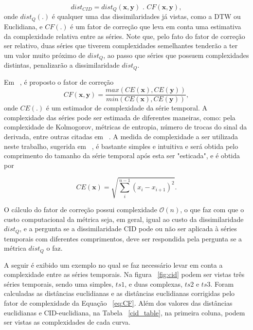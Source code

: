 \begin{equation}
dist_{CID} = dist_{Q}(\bm{x},\bm{y}) \text{ . } CF(\bm{x},\bm{y}),
\end{equation}
onde $dist_{Q}(.)$ é qualquer uma das dissimilaridades já vistas, como a DTW ou Euclidiana, e $CF(.)$ é um fator de correção que leva em conta uma estimativa da complexidade relativa entre as séries. Note que, pelo fato do fator de correção ser relativo, duas séries que tiverem complexidades semelhantes tenderão a ter um valor muito próximo de $dist_{Q}$, ao passo que séries que possuem complexidades distintas, penalizarão a dissimilaridade $dist_{Q}$.

Em ~\parencite{CID}, é proposto o fator de correção
\begin{equation} \label{eq:CF}
CF (\bm{x},\bm{y}) = \frac{max(CE(\bm{x}),CE(\bm{y}))}{min(CE(\bm{x}),CE(\bm{y}))},
\end{equation}
onde $CE(.)$ é um estimador de complexidade da série temporal.  A complexidade das séries pode ser estimada de diferentes maneiras, como: pela complexidade de Kolmogorov, métricas de entropia, número de trocas do sinal da derivada, entre outras citadas em ~\parencite{TSCLUST}. A medida de complexidade a ser utilizada neste trabalho, sugerida em ~\parencite{CID}, é bastante simples e intuitiva e será obtida pelo comprimento do tamanho da série temporal após esta ser "esticada", e é obtida por 

\begin{equation} \label{eq:CE}
CE(\bm{x}) = \sqrt{\sum_{i}^{n-1} (x_i - x_{i+1})^2}.
\end{equation}

O cálculo do fator de correção possui complexidade $\mathcal{O}(n)$, o que faz com que o custo computacional da métrica seja, em geral, igual ao custo da dissimilaridade $dist_{Q}$, e a pergunta se a dissimilaridade CID pode ou não ser aplicada à séries temporais com diferentes comprimentos, deve ser respondida pela pergunta se a métrica $dist_{Q}$ o faz.

A seguir é exibido um exemplo no qual se faz necessário levar em conta a complexidade entre as séries temporais. Na figura ~\ref{fig:cid} podem ser vistas três séries temporais, sendo uma simples, $ts1$, e duas complexas, $ts2$ e $ts3$. Foram calculadas as distâncias euclidianas e as distâncias euclidianas corrigidas pelo fator de complexidade da Equação ~\ref{eq:CF}. Além dos valores das distâncias euclidianas e CID-euclidiana, na Tabela ~\ref{cid_table}, na primeira coluna, podem ser vistas as complexidades de cada curva. 

